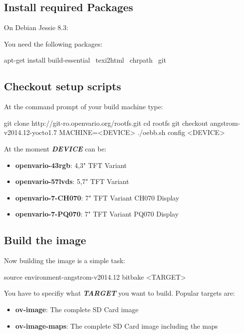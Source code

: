 \subsection{Install required Packages} 
On Debian Jessie 8.3: 

You need the following packages: 
\begin{verbatim*}
    apt-get install build-essential \
		    texi2html \
		    chrpath \
		    git 
\end{verbatim*}

\subsection{Checkout setup scripts}

At the command prompt of your build machine type:

\begin{verbatim*}
git clone http://git-ro.openvario.org/rootfs.git
cd rootfs
git checkout angstrom-v2014.12-yocto1.7
MACHINE=<DEVICE> ./oebb.sh config <DEVICE>
\end{verbatim*}

At the moment \textbf{\textit{DEVICE}} can be:

\begin{itemize}
	\item \textbf{openvario-43rgb}: 4,3" TFT Variant
	\item \textbf{openvario-57lvds}: 5,7" TFT Variant
	\item \textbf{openvario-7-CH070}: 7" TFT Variant CH070 Display
	\item \textbf{openvario-7-PQ070}: 7" TFT Variant PQ070 Display
\end{itemize}

\subsection{Build the image}
Now building the image is a simple task:

\begin{verbatim*}
source environment-angstrom-v2014.12
bitbake <TARGET>
\end{verbatim*}

You have to specifiy what \textbf{\textit{TARGET}} you want to build. Popular targets are:
\begin{itemize}
	\item \textbf{ov-image}: The complete SD Card image
	\item \textbf{ov-image-maps}: The complete SD Card image including the maps
\end{itemize}

